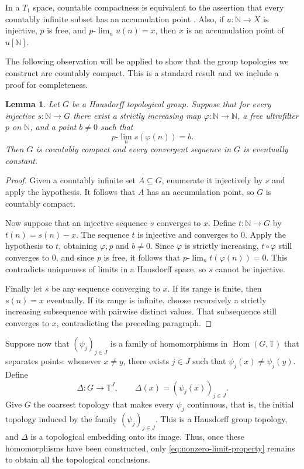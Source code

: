 \documentclass[10pt,a4paper]{amsart}
\newtheorem{lemma}[theorem]{Lemma}
\newcommand{\T}{\mathbb T}
\newcommand{\N}{\mathbb N}
\newcommand{\Hom}{\operatorname{Hom}}
\begin{document}
In a $T_1$ space, countable
compactness is equivalent to the assertion that every countably infinite
subset has an accumulation point
\cite[Theorem~3.10.3(v)]{Engelking1989}.  Also, if $u:\N\to X$ is injective,
$p$ is free, and $p\text{-}\lim_n u(n)=x$, then $x$ is an accumulation point
of $u[\N]$.

The following observation will be applied to show that the group topologies
we construct are countably compact.
This is a standard result and we include a proof for completeness.

\begin{lemma}\label{lem:topological-reduction}
Let $G$ be a Hausdorff topological group.  Suppose that for every injective
$s:\N\to G$ there exist a strictly increasing map $\varphi:\N\to\N$, a free
ultrafilter $p$ on $\N$, and a point $b\neq0$ such that
\begin{equation}\label{eq:nonzero-limit-property}
 p\text{-}\lim_n s(\varphi(n))=b.
\end{equation}
Then $G$ is countably compact and every convergent sequence in $G$ is
eventually constant.
\end{lemma}

\begin{proof}
Given a countably infinite set $A\subseteq G$, enumerate it injectively by
$s$ and apply the hypothesis.  It follows that $A$ has an accumulation point,
so $G$ is countably compact.

Now suppose that an injective sequence $s$ converges to $x$.  Define
$t:\N\to G$ by $t(n)=s(n)-x$.
The sequence $t$ is injective and converges to $0$.  Apply the hypothesis
to $t$, obtaining $\varphi,p$ and $b\neq0$.  Since $\varphi$ is strictly
increasing, $t\circ\varphi$ still converges to $0$, and since $p$ is
free, it follows that $p\text{-}\lim_n t(\varphi(n))=0$.  This contradicts
uniqueness of limits in a Hausdorff space, so $s$ cannot be injective.

Finally let $s$ be any sequence converging to $x$.  If its range is finite,
then
$s(n)=x$ eventually.  If its range is infinite, choose recursively a
strictly increasing subsequence with pairwise distinct values.  That
subsequence still converges to $x$, contradicting the preceding paragraph.
\end{proof}

Suppose now that $(\psi_j)_{j\in J}$ is a family of homomorphisms in
$\Hom(G,\T)$ that separates points: whenever $x\neq y$, there exists $j\in J$
such that $\psi_j(x)\neq\psi_j(y)$.  Define
\[
 \Delta:G\longrightarrow\T^J,
 \qquad \Delta(x)=(\psi_j(x))_{j\in J}.
\]
Give $G$ the coarsest topology that makes every $\psi_j$ continuous, that is,
the initial topology induced by the family $(\psi_j)_{j\in J}$. This is a
Hausdorff group topology, and $\Delta$ is a topological embedding
onto its image.  Thus, once these homomorphisms have been constructed, only
\eqref{eq:nonzero-limit-property} remains to obtain all the topological
conclusions.
\end{document}
